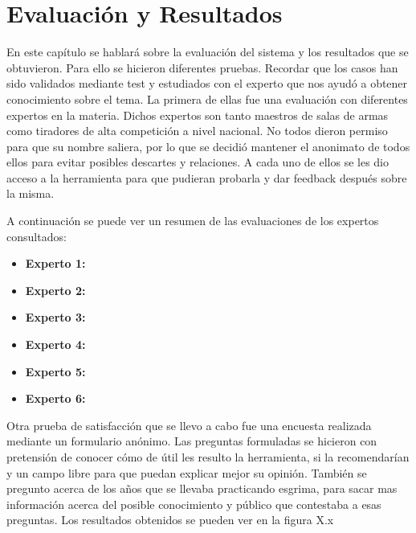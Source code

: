 \chapter{Evaluación y Resultados}
\label{cap:Evaluación y resultados}

En este capítulo se hablará sobre la evaluación del sistema y los resultados que se obtuvieron.
Para ello se hicieron diferentes pruebas. Recordar que los casos han sido validados mediante
test y estudiados con el experto que nos ayudó a obtener conocimiento sobre el tema.
La primera de ellas fue una evaluación con diferentes
expertos en la materia. Dichos expertos son tanto maestros de salas de armas como tiradores
de alta competición a nivel nacional. No todos dieron permiso para que su nombre saliera, por
lo que se decidió mantener el anonimato de todos ellos para evitar posibles descartes y relaciones.
A cada uno de ellos se les dio acceso a la herramienta para que pudieran probarla y dar feedback
después sobre la misma.

A continuación se puede ver un resumen de las evaluaciones de los expertos consultados:
\begin{itemize}
  \item \textbf{Experto 1:} %
  \item \textbf{Experto 2:} %
  \item \textbf{Experto 3:} %
  \item \textbf{Experto 4:} %
  \item \textbf{Experto 5:} %
  \item \textbf{Experto 6:} %
\end{itemize}

Otra prueba de satisfacción que se llevo a cabo fue una encuesta realizada mediante un formulario
anónimo. Las preguntas formuladas se hicieron con pretensión de conocer cómo de útil les resulto
la herramienta, si la recomendarían y un campo libre para que puedan explicar mejor su opinión.
También se pregunto acerca de los años que se llevaba practicando esgrima, para sacar mas información
acerca del posible conocimiento y público que contestaba a esas preguntas.
Los resultados obtenidos se pueden ver en la figura X.x

